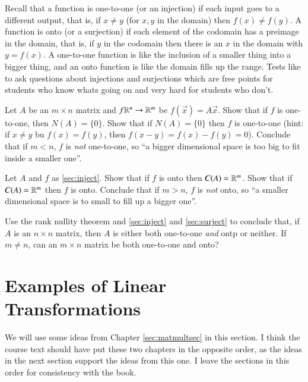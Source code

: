 Recall that a function is one-to-one (or an injection) if each input goes to a different output, that is, if $x\ne y$ (for $x,y$ in the domain) then $f(x)\ne f(y)$.
A function is onto (or a surjection) if each element of the codomain has a preimage in the domain, that is, if $y$ in the codomain then there is an $x$ in the domain with $y=f(x)$.  
A one-to-one function is like the inclusion of a smaller thing into a bigger thing, and an onto function is like the domain fills up the range.  
Tests like to ask questions about injections and surjections which are free points for students who know whats going on and very hard for students who don't.  

\begin{ImpEasyEx}
  \label{sec:inject}
  Let $A$ be an $m\times n$ matrix and $f\mathbb{R}^n\to \mathbb{R}^m$ be $f(\vec{x}) = A\vec{x}$.
  Show that if $f$ is one-to-one, then $N(A)=\{0\}$.  
  Show that if $N(A)=\{0\}$ then $f$ is one-to-one (hint: if $x\ne y$ bu $f(x)=f(y)$, then $f(x-y)=f(x)-f(y)=0$).
  Conclude that if $m< n$, $f$ is \emph{not} one-to-one, so ``a bigger dimensional space is too big to fit inside a smaller one''.
\end{ImpEasyEx}

\begin{ImpEasyEx}
  \label{sec:surject}
  Let $A$ and $f$ as \ref{sec:inject}.  
  Show that if $f$ is onto then $C(A)=\mathbb{R}^m$.
  Show that if $C(A)=\mathbb{R}^m$ then $f$ is onto.  
  Conclude that if $m> n$, $f$ is \emph{not} onto, so ``a smaller dimensional space is to small to fill up a bigger one''.
\end{ImpEasyEx}

\begin{ImpEasyEx}
  \label{sec:surjandinj}
  Use the rank nullity theorem and \ref{sec:inject} and \ref{sec:surject} to conclude that, if $A$ is an $n\times n$ matrix, then $A$ is either both one-to-one \emph{and} ontp or neither.  
  If $m\ne n$, can an $m\times n$ matrix be both one-to-one and onto?
\end{ImpEasyEx}

\exersisesm

\section{Examples of Linear Transformations}

\label{sec:examplelintranssec}

\begin{Warning}
  We will use some ideas from Chapter \ref{sec:matmultsec} in this section.
  I think the course text should have put these two chapters in the opposite order, as the ideas in the next section support the ideas from this one.
  I leave the sections in this order for consistency with the book.
\end{Warning}
  
